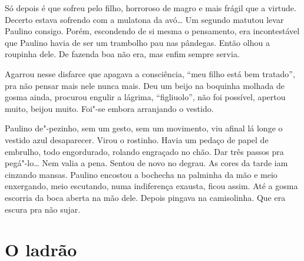 \begin{linenumbers}
Só depois é que sofreu pelo filho, horroroso de magro e mais frágil que
a virtude. Decerto estava sofrendo com a mulatona da avó\ldots{} Um segundo
matutou levar Paulino consigo. Porém, escondendo de si mesma o
pensamento, era incontestável que Paulino havia de ser um trambolho pau
nas pândegas. Então olhou a roupinha dele. De fazenda boa não era, mas
enfim sempre servia. 

Agarrou nesse disfarce que apagava a consciência, ``meu filho está bem
tratado'', pra não pensar mais nele nunca mais. Deu um beijo na boquinha
molhada de gosma ainda, procurou engulir a lágrima, ``figliuolo'', não
foi possível, apertou muito, beijou muito. Foi"-se embora arranjando o
vestido.

Paulino de"-pezinho, sem um gesto, sem um movimento, viu afinal lá longe
o vestido azul desaparecer. Virou o rostinho. Havia um pedaço de papel
de embrulho, todo engordurado, rolando engraçado no chão. Dar três
passos pra pegá"-lo\ldots{} Nem valia a pena. Sentou de novo no degrau. As
cores da tarde iam cinzando mansas. Paulino encostou a bochecha na
palminha da mão e meio enxergando, meio escutando, numa indiferença
exausta, ficou assim. Até a gosma escorria da boca aberta na mão dele.
Depois pingava na camisolinha. Que era escura pra não sujar.
\end{linenumbers}

\chapter{O ladrão}

